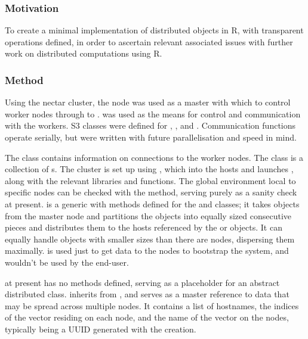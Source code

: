\subsubsection{Motivation}\label{sec:ds-motivation}

To create a minimal implementation of distributed objects in R, with
transparent operations defined, in order to ascertain relevant
associated issues with further work on distributed computations using R.

\subsubsection{Method}\label{method}

Using the nectar cluster, the  node was used as a master
with which to control worker nodes  through to
.  was used as the means for control and
communication with the workers. S3 classes were defined for
, ,  and
. Communication functions operate serially,
but were written with future parallelisation and speed in mind.

The  class contains information on connections to the
worker nodes. The  class is a collection of
s. The cluster is set up using ,
which  into the hosts and launches , along with the
relevant libraries and functions. The global environment local to
specific nodes can be checked with the  method, serving
purely as a sanity check at present.  is a generic with
methods defined for the  and  classes; it
takes objects from the master node and partitions the objects into
equally sized consecutive pieces and distributes them to the hosts
referenced by the  or  objects. It can
equally handle objects with smaller  sizes than there are
nodes, dispersing them maximally.  is used just to get
data to the nodes to bootstrap the system, and wouldn't be used by the
end-user.

 at present has no methods defined, serving
as a placeholder for an abstract distributed class.
 inherits from ,
and serves as a master reference to data that may be spread across
multiple nodes. It contains a list of hostnames, the indices of the
vector residing on each node, and the name of the vector on the nodes,
typically being a UUID generated with the 
creation.

